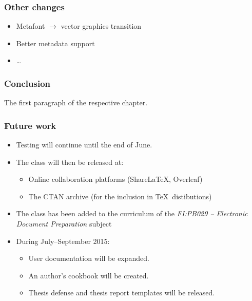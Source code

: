 \documentclass[12pt]{beamer}
\begin{document}
  \begin{frame}
    \frametitle{Other changes}
    \begin{itemize}[<+->]
      \item Metafont $\rightarrow$ vector graphics transition
      \item Better metadata support
      \item \ldots
    \end{itemize}
  \end{frame}
  \begin{frame}
    \frametitle{Conclusion}
    The first paragraph of the respective chapter.
  \end{frame}
  \begin{frame}
    \frametitle{Future work}
    \begin{itemize}[<+->]
      \item Testing will continue until the end of June.
      \item The class will then be released at:\begin{itemize} 
        \item Online collaboration platforms (Share\LaTeX, Overleaf)
        \item The CTAN archive (for the inclusion in \TeX\ distibutions)
      \end{itemize}
      \item The class has been added to the curriculum of the \emph{FI:PB029 -- Electronic Document Preparation} subject
      \item During July--September 2015:\begin{itemize} 
        \item User documentation will be expanded.
        \item An author’s cookbook will be created.
        \item Thesis defense and thesis report templates will be released.
      \end{itemize}
    \end{itemize}
  \end{frame}
\end{document}

